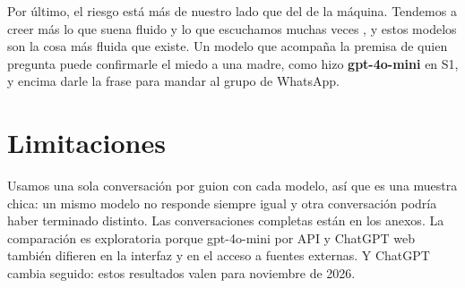 \documentclass[11pt,a4paper]{article}
\newcommand{\viejo}{\textcolor{viejo}{\textbf{gpt-4o-mini}}}
\begin{document}
Por último, el riesgo está más de nuestro lado que del de la máquina. Tendemos a creer más lo que suena fluido y lo que escuchamos muchas veces \cite{hasher}, y estos modelos son la cosa más fluida que existe. Un modelo que acompaña la premisa de quien pregunta puede confirmarle el miedo a una madre, como hizo \viejo{} en S1, y encima darle la frase para mandar al grupo de WhatsApp.

\section{Limitaciones}
Usamos una sola conversación por guion con cada modelo, así que es una muestra chica: un mismo modelo no responde siempre igual y otra conversación podría haber terminado distinto. Las conversaciones completas están en los anexos. La comparación es exploratoria porque gpt-4o-mini por API y ChatGPT web también difieren en la interfaz y en el acceso a fuentes externas. Y ChatGPT cambia seguido: estos resultados valen para noviembre de 2026.
\end{document}
